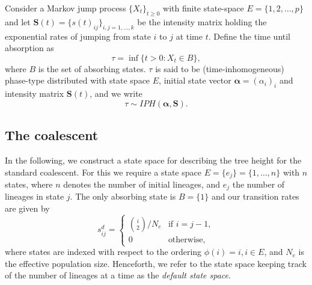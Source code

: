 \documentclass[hidelinks,11pt]{article}
\begin{document}
    Consider a Markov jump process $\{X_t\}_{t\geq0}$ with finite state-space $E=\{1, 2, \dots,p\}$ and let $\mathbf{S}(t)=\{s(t)_{ij} \}_{i,j=1,\dots,k}$ be the intensity matrix holding the exponential rates of jumping from state $i$ to $j$ at time $t$.
    Define the time until absorption as %
    \begin{equation*}
        \tau = \inf\{t>0:X_t \in B\},
    \end{equation*}
    where $B$ is the set of absorbing states. $\tau$ is said to be (time-inhomogeneous) phase-type distributed with state space $E$, initial state vector $\bm{\alpha}=(\alpha_i)_i$ and intensity matrix $\mathbf{S}(t)$, and we write
    \begin{equation*}
        \tau \sim IPH(\bm{\alpha},\mathbf{S}).
    \end{equation*}

    \subsection{The coalescent}\label{subsec:the-coalescent}
    In the following, we construct a state space for describing the tree height for the standard coalescent.
    For this we require a state space $E=\{e_j\}=\{1, \dots, n\}$ with $n$ states, where $n$ denotes the number of initial lineages, and $e_j$ the number of lineages in state $j$.
    The only absorbing state is $B=\{1\}$ and our transition rates are given by
    \begin{equation*}
        s^d_{ij} = \begin{cases}
                       \binom{i}{2} / N_e & \text{if } i = j - 1, \\ 0 & \text{otherwise,}
        \end{cases}
    \end{equation*}
    where states are indexed with respect to the ordering $\phi(i) = i, i \in E$, and $N_e$ is the effective population size.
    Henceforth, we refer to the state space keeping track of the number of lineages at a time as the \textit{default state space}.
\end{document}
